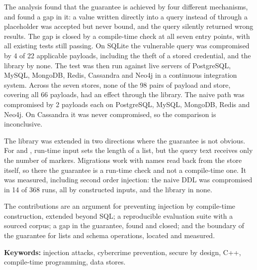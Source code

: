 The analysis found that the guarantee is achieved by four different mechanisms,
and found a gap in it: a value written directly into a query instead of through a
placeholder was accepted but never bound, and the query silently returned wrong
results. The gap is closed by a compile-time check at all seven entry points,
with all existing tests still passing. On SQLite the vulnerable query
was compromised by 4 of 22 applicable payloads, including the theft of a stored
credential, and the library by none. The test was then run against live servers
of PostgreSQL, MySQL, MongoDB, Redis, Cassandra and Neo4j in a continuous
integration system. Across the seven stores, none of the 98 pairs of payload
and store, covering all 66 payloads, had an effect through the library. The naive
path was compromised by 2 payloads each on PostgreSQL, MySQL, MongoDB, Redis and
Neo4j. On Cassandra it was never compromised, so the comparison is inconclusive.

The library was extended in two directions where the guarantee is not obvious. For
 and , run-time input sets the length of a list, but the query
text receives only the number of markers. Migrations work with names read back from
the store itself, so there the guarantee is a run-time check and not a compile-time
one. It was measured, including second order injection: the naive DDL was compromised
in 14 of 368 runs, all by constructed inputs, and the library in none.

The contributions are an argument for preventing injection by compile-time
construction, extended beyond SQL; a reproducible evaluation suite with a sourced
corpus; a gap in the guarantee, found and closed; and the boundary of the guarantee
for lists and schema operations, located and measured.

\bigskip
\noindent\textbf{Keywords:} injection attacks, cybercrime prevention, secure by
design, C++, compile-time programming, data stores.
